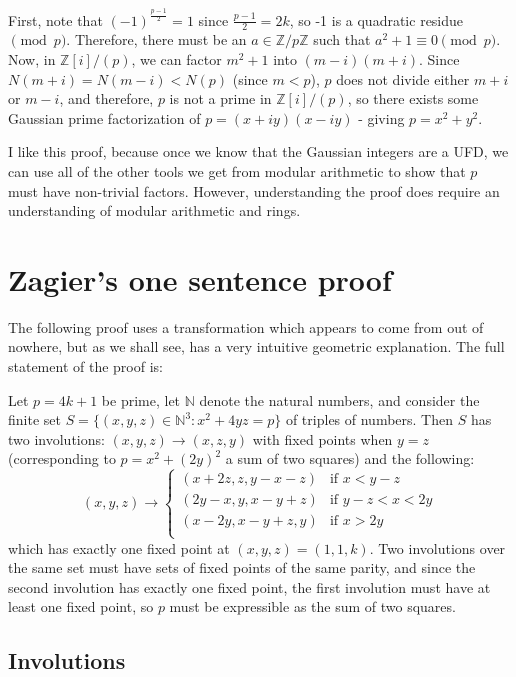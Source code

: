 \documentclass{article}
\begin{document}
First, note that $(-1)^{\frac{p-1}{2}} = 1$ since $\frac{p-1}{2}=2k$, so -1 is a quadratic
residue $\pmod{p}$. Therefore, there must be an $a \in \mathbb{Z}/p\mathbb{Z}$ such that
$a^2 + 1 \equiv 0 \pmod{p}$. Now, in $\mathbb{Z}[i]/(p)$, we can factor $m^2+1$ into
$(m-i)(m+i)$. Since $N(m+i)=N(m-i)<N(p)$ (since $m < p$), $p$ does not divide either $m+i$ or
$m-i$, and therefore, $p$ is not a prime in $\mathbb{Z}[i]/(p)$, so there exists some Gaussian 
prime factorization of $p = (x+iy)(x-iy)$ - giving $p = x^2+y^2$.

I like this proof, because once we know that the Gaussian integers are a UFD, we can use all of
the other tools we get from modular arithmetic to show that $p$ must have non-trivial factors.
However, understanding the proof does require an understanding of modular arithmetic and rings.

\section{Zagier's one sentence proof}

The following proof uses a transformation which appears to come from out of nowhere, but as we
shall see, has a very intuitive geometric explanation. The full statement of the proof is:

Let $p=4k+1$ be prime, let $\mathbb{N}$ denote the natural numbers, and consider the finite set
$S=\{(x,y,z) \in \mathbb{N}^3: x^2+4yz = p\}$ of triples of numbers. Then $S$ has two 
involutions: $(x,y,z) \to (x,z,y)$ with fixed points when $y=z$ (corresponding to 
$p=x^2+(2y)^2$ a sum of two squares) and the following:
\[ (x,y,z) \to
\left\{
	\begin{array}{ll}
		(x+2z,z,y-x-z)  & \mbox{if } x< y-z \\
		(2y-x,y,x-y+z)  & \mbox{if } y-z < x < 2y \\
		(x-2y,x-y+z,y)  & \mbox{if } x > 2y \\
	\end{array}
\right. \]
which has exactly one fixed point at $(x,y,z) = (1,1,k)$. Two involutions over the same
set must have sets of fixed points of the same parity, and since the second involution
has exactly one fixed point, the first involution must have at least one fixed point, so
$p$ must be expressible as the sum of two squares.

\subsection{Involutions}
\end{document}
